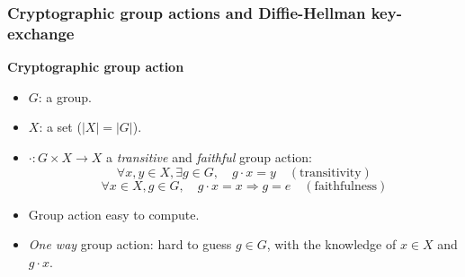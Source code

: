 \documentclass[10pt]{beamer}
\theoremstyle{plain}
\theoremstyle{definition}
\renewcommand{\(}{\left(}
\renewcommand{\)}{\right)}
\begin{document}
\subsubsection{Cryptographic group actions and Diffie-Hellman key-exchange}


\begin{frame}
\textbf{Cryptographic group action}

\vspace{0.5cm}

\begin{itemize}
\item $G$: a group.
\item $X$: a set ($|X|=|G|$).
\pause 
\item $\cdot : G\times X\longrightarrow X$ a \emph{transitive} and \emph{faithful} group action:
\[\forall x,y\in X, \exists g\in G, \quad g\cdot x=y \quad (\mbox{transitivity})\]
\[\forall x\in X,  g\in G, \quad g\cdot x=x \Longrightarrow g=e \quad (\mbox{faithfulness})\]
\pause
\item Group action easy to compute.
\item \emph{One way} group action: hard to guess $g\in G$, with the knowledge of $x\in X$ and $g\cdot x$.
\end{itemize}

\end{frame}
\end{document}
